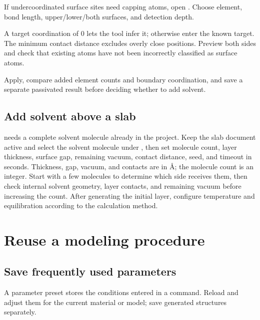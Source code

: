 \begin{steps}
  \item If undercoordinated surface sites need capping atoms, open . Choose element, bond length, upper/lower/both surfaces, and detection depth.
  \item A target coordination of 0 lets the tool infer it; otherwise enter the known target. The minimum contact distance excludes overly close positions. Preview both sides and check that existing atoms have not been incorrectly classified as surface atoms.
  \item Apply, compare added element counts and boundary coordination, and save a separate passivated result before deciding whether to add solvent.
\end{steps}

\subsection{Add solvent above a slab}

 needs a complete solvent molecule already in the project. Keep the slab document active and select the solvent molecule under , then set molecule count, layer thickness, surface gap, remaining vacuum, contact distance, seed, and timeout in seconds. Thickness, gap, vacuum, and contacts are in \AA; the molecule count is an integer. Start with a few molecules to determine which side receives them, then check internal solvent geometry, layer contacts, and remaining vacuum before increasing the count. After generating the initial layer, configure temperature and equilibration according to the calculation method.

\section{Reuse a modeling procedure}

\subsection{Save frequently used parameters}\label{sec:modeling-preset-reference}

A parameter preset stores the conditions entered in a command. Reload and adjust them for the current material or model; save generated structures separately.

